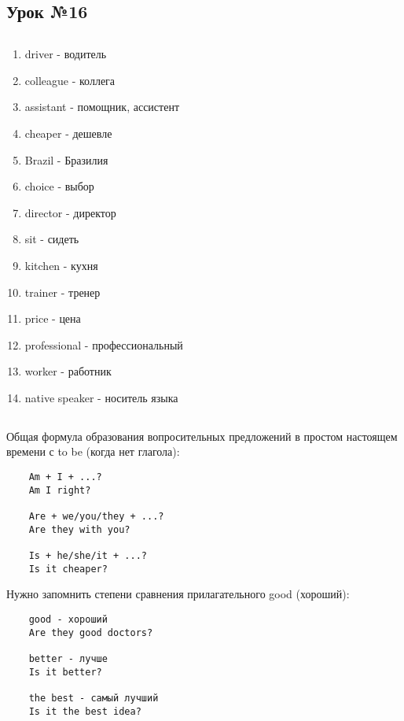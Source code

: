 \subsection{Урок №16}

\subsection*{}
\begin{multicols}{2}
    \begin{enumerate}\setlength{\itemsep}{0pt}
        \item driver - водитель
        \item colleague - коллега
        \item assistant - помощник, ассистент
        \item cheaper - дешевле
        \item Brazil - Бразилия
        \item choice - выбор
        \item director - директор
        \item sit - сидеть
        \item kitchen - кухня
        \item trainer - тренер
        \item price - цена
        \item professional - профессиональный
        \item worker - работник
        \item native speaker - носитель языка
    \end{enumerate}
\end{multicols}

\subsection*{}
Общая формула образования вопросительных предложений в простом настоящем времени с to be (когда нет глагола):
\begin{verbatim}
    Am + I + ...?
    Am I right?

    Are + we/you/they + ...?
    Are they with you?

    Is + he/she/it + ...?
    Is it cheaper?
\end{verbatim}

Нужно запомнить степени сравнения прилагательного good (хороший):
\begin{verbatim}
    good - хороший
    Are they good doctors?

    better - лучше
    Is it better?

    the best - самый лучший
    Is it the best idea?
\end{verbatim}